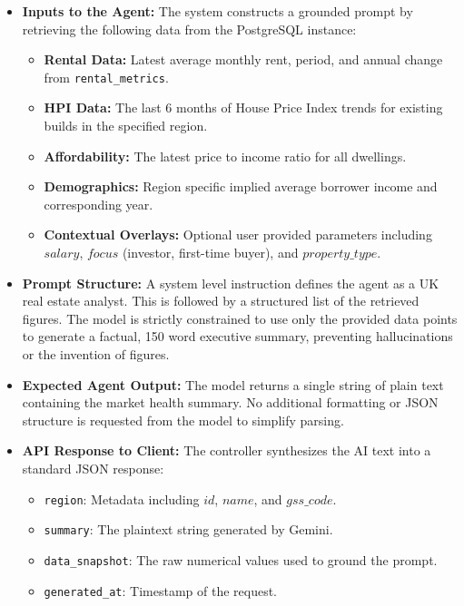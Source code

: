 \documentclass[11pt,a4paper]{article}
\begin{document}
\begin{itemize}
    \item \textbf{Inputs to the Agent:}
    The system constructs a grounded prompt by retrieving the following data from the PostgreSQL instance:
    \begin{itemize}[nosep]
        \item \textbf{Rental Data:} Latest average monthly rent, period, and annual change from \texttt{rental\_metrics}.
        \item \textbf{HPI Data:} The last 6 months of House Price Index trends for existing builds in the specified region.
        \item \textbf{Affordability:} The latest price to income ratio for all dwellings.
        \item \textbf{Demographics:} Region specific implied average borrower income and corresponding year.
        \item \textbf{Contextual Overlays:} Optional user provided parameters including $salary$, $focus$ (investor, first-time buyer), and $property\_type$.
    \end{itemize}
    
    \item \textbf{Prompt Structure:} 
    A system level instruction defines the agent as a UK real estate analyst. This is followed by a structured list of the retrieved figures. The model is strictly constrained to use only the provided data points to generate a factual, 150 word executive summary, preventing hallucinations or the invention of figures.

    \item \textbf{Expected Agent Output:}
    The model returns a single string of plain text containing the market health summary. No additional formatting or JSON structure is requested from the model to simplify parsing.

    \item \textbf{API Response to Client:}
    The controller synthesizes the AI text into a standard JSON response:
    \begin{itemize}[nosep]
        \item \texttt{region}: Metadata including $id$, $name$, and $gss\_code$.
        \item \texttt{summary}: The plaintext string generated by Gemini.
        \item \texttt{data\_snapshot}: The raw numerical values used to ground the prompt.
        \item \texttt{generated\_at}: Timestamp of the request.
    \end{itemize}
\end{itemize}
\end{document}
